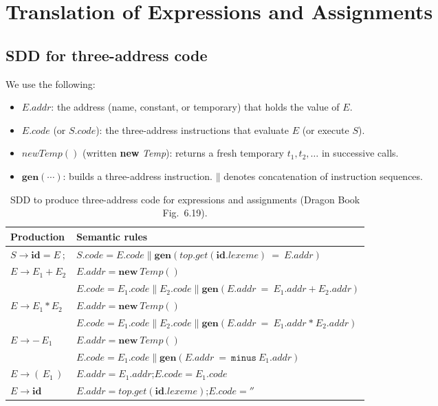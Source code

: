 \documentclass[11pt,a4paper]{article}
\newcommand{\gen}[1]{\ensuremath{\mathbf{gen}(#1)}}
\newcommand{\cc}{\mathbin{\|}}
\newcommand{\at}[2]{\ensuremath{#1.\mathit{#2}}}
\newcommand{\tok}[1]{\ensuremath{\mathtt{#1}}}
\begin{document}

\section{Translation of Expressions and Assignments}

\subsection{SDD for three-address code}
\label{sec:exprtac}
We use the following:
\begin{itemize}
\item \at{E}{addr}: the address (name, constant, or temporary) that holds the value of $E$.
\item \at{E}{code} (or \at{S}{code}): the three-address instructions that evaluate $E$ (or execute $S$).
\item $\mathit{newTemp}()$ (written \textbf{new} \textit{Temp}): returns a fresh temporary $t_1, t_2,\dots$ in successive calls.
\item $\gen{\cdots}$: builds a three-address instruction. $\cc$ denotes concatenation of instruction sequences.
\end{itemize}

\begin{table}[htbp]
\centering
\small
\begin{tabular}{@{}L{3.3cm} L{11.4cm}@{}}
\toprule
\textbf{Production} & \textbf{Semantic rules} \\ \midrule
$S \to \mathbf{id} = E\ ;$ &
$\at{S}{code} = \at{E}{code} \cc \gen{\mathit{top}.\mathit{get}(\at{\mathbf{id}}{lexeme})\ \tok{=}\ \at{E}{addr}}$ \\
$E \to E_1 + E_2$ &
$\at{E}{addr} = \mathbf{new}\ \mathit{Temp}()$\\ &
$\at{E}{code} = \at{E_1}{code} \cc \at{E_2}{code} \cc \gen{\at{E}{addr}\ \tok{=}\ \at{E_1}{addr}\ \tok{+}\ \at{E_2}{addr}}$ \\
$E \to E_1 * E_2$ &
$\at{E}{addr} = \mathbf{new}\ \mathit{Temp}()$\\ &
$\at{E}{code} = \at{E_1}{code} \cc \at{E_2}{code} \cc \gen{\at{E}{addr}\ \tok{=}\ \at{E_1}{addr}\ \tok{*}\ \at{E_2}{addr}}$ \\
$E \to -\,E_1$ &
$\at{E}{addr} = \mathbf{new}\ \mathit{Temp}()$\\ &
$\at{E}{code} = \at{E_1}{code} \cc \gen{\at{E}{addr}\ \tok{=}\ \tok{minus}\ \at{E_1}{addr}}$ \\
$E \to (\,E_1\,)$ &
$\at{E}{addr} = \at{E_1}{addr}$;\quad $\at{E}{code} = \at{E_1}{code}$ \\
$E \to \mathbf{id}$ &
$\at{E}{addr} = \mathit{top}.\mathit{get}(\at{\mathbf{id}}{lexeme})$;\quad $\at{E}{code} = \tok{''}$ \\ \bottomrule
\end{tabular}
\caption{SDD to produce three-address code for expressions and assignments (Dragon Book Fig.~6.19).}
\label{tab:expr-sdd}
\end{table}
\end{document}
